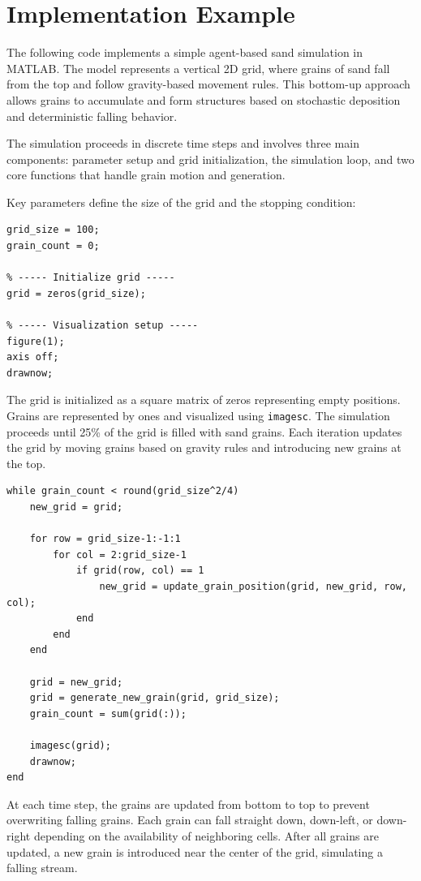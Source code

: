 \documentclass{article}
\begin{document}
\section{Implementation Example}
The following code implements a simple agent-based sand simulation in MATLAB. The model represents a vertical 2D grid, where grains of sand fall from the top and follow gravity-based movement rules. This bottom-up approach allows grains to accumulate and form structures based on stochastic deposition and deterministic falling behavior.

The simulation proceeds in discrete time steps and involves three main components: parameter setup and grid initialization, the simulation loop, and two core functions that handle grain motion and generation.

Key parameters define the size of the grid and the stopping condition:

\begin{lstlisting}[caption={Parameters and Initialization}]
% ----- Parameters -----
grid_size = 100;
grain_count = 0;

% ----- Initialize grid -----
grid = zeros(grid_size);

% ----- Visualization setup -----
figure(1);
axis off;
drawnow;
\end{lstlisting}

The grid is initialized as a square matrix of zeros representing empty positions. Grains are represented by ones and visualized using \texttt{imagesc}. The simulation proceeds until 25\% of the grid is filled with sand grains. Each iteration updates the grid by moving grains based on gravity rules and introducing new grains at the top.

\begin{lstlisting}[caption={Simulation loop}]
while grain_count < round(grid_size^2/4)
    new_grid = grid;

    for row = grid_size-1:-1:1
        for col = 2:grid_size-1
            if grid(row, col) == 1
                new_grid = update_grain_position(grid, new_grid, row, col);
            end
        end
    end

    grid = new_grid;
    grid = generate_new_grain(grid, grid_size);
    grain_count = sum(grid(:));

    imagesc(grid);
    drawnow;
end
\end{lstlisting}

At each time step, the grains are updated from bottom to top to prevent overwriting falling grains. Each grain can fall straight down, down-left, or down-right depending on the availability of neighboring cells. After all grains are updated, a new grain is introduced near the center of the grid, simulating a falling stream.
\end{document}
